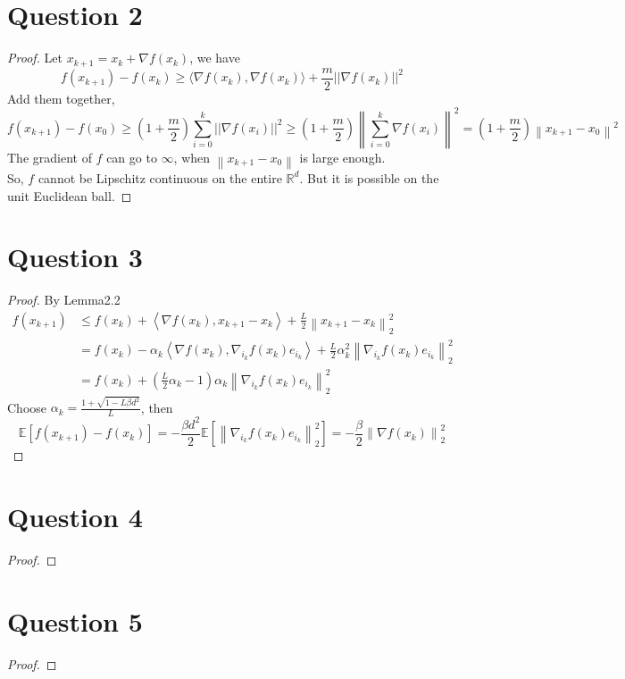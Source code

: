 \documentclass{article}
\begin{document}
\section*{Question 2}
    \begin{proof}
    Let $x_{k+1}=x_{k}+\nabla f(x_k)$, we have
    $$f(x_{k+1})-f(x_k)\geqslant \langle \nabla f(x_k),\nabla f(x_k) \rangle + \frac{m}{2}||\nabla f(x_k)||^2$$
    Add them together,
    $$f(x_{k+1})-f(x_0) \geqslant \left(1+\frac{m}{2}\right)\sum_{i=0}^{k} ||\nabla f(x_{i})||^2 \geqslant \left(1+\frac{m}{2}\right) \left\lVert \sum_{i=0}^{k} \nabla f(x_{i})\right\rVert^2 = \left(1+\frac{m}{2}\right)\left\lVert x_{k+1}-x_0 \right \rVert^2$$
    The gradient of $f$ can go to $\infty$, when $\left\lVert x_{k+1}-x_0 \right \rVert$ is large enough.\\
    So, $f$ cannot be Lipschitz continuous on the entire $\mathbb{R}^d$.
    But it is possible on the unit Euclidean ball.
    \end{proof}


\section*{Question 3}
    \begin{proof}
        By Lemma2.2
        \begin{align*}
            f(x_{k+1})
            &\leqslant f(x_k) 
                + \left\langle \nabla f(x_k), x_{k+1}-x_k \right\rangle 
                + \frac{L}{2} \left\lVert x_{k+1}-x_k \right \rVert_2^2\\
            &=f(x_k)
                -\alpha_k \left\langle \nabla f(x_k), \nabla_{i_k}f(x_k)e_{i_k} \right\rangle
                +\frac{L}{2} \alpha_k^2 \left\lVert \nabla_{i_k}f(x_k)e_{i_k} \right \rVert_2^2\\
            &=f(x_k)
                +\left(\frac{L}{2}\alpha_k -1\right)\alpha_k \left\lVert \nabla_{i_k}f(x_k)e_{i_k} \right \rVert_2^2
        \end{align*}
        Choose $\alpha_k = \frac{1+\sqrt{1-L\beta d^2}}{L}$, then
        $$\mathbb{E}[f(x_{k+1})-f(x_k)] = -\frac{\beta d^2}{2}\mathbb{E}[\left\lVert \nabla_{i_k}f(x_k)e_{i_k} \right \rVert_2^2]=-\frac{\beta}{2}\left\lVert \nabla f(x_k) \right \rVert_2^2$$
    \end{proof}


\section*{Question 4}
    \begin{proof}
        
    \end{proof}


\section*{Question 5}
    \begin{proof}
        
    \end{proof}
\end{document}
